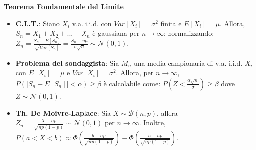 \documentclass[8pt]{extarticle}
\begin{document}
\begin{multicols*}{3}
    \textbf{\underline{Teorema Fondamentale del Limite}}
    \begin{itemize}
        \item \textbf{C.L.T.}: Siano $X_{i}$ v.a. i.i.d. con $Var[X_{i}]=\sigma^{2}$ finita e $E[X_{i}]=\mu$. Allora, $S_{n}=X_{1}+X_{2}+...+X_{n}$ è gaussiana per $n\rightarrow\infty$; normalizzando: $Z_{n}=\frac{S_{n}-E[S_{n}]}{\sqrt{Var[S_{n}]}}=\frac{S_{n}-n\mu}{\sigma\sqrt{n}}\sim\mathcal{N}(0,1)$.
        \item \textbf{Problema del sondaggista}: Sia $M_{n}$ una media campionaria di v.a. i.i.d. $X_{i}$ con $E[X_{i}]=\mu$ e $Var[X_{i}]=\sigma^{2}$. Allora, per $n\rightarrow\infty$, $P(|S_{n}-E[S_{n}]|<\alpha)\ge\beta$ è calcolabile come: $P\left(Z<\frac{\alpha\sqrt{n}}{\sigma}\right)\ge\beta$ dove $Z\sim\mathcal{N}(0,1)$.
        \item \textbf{Th. De Moivre-Laplace}: Sia $X\sim\mathcal{B}(n,p)$, allora $Z_{n}=\frac{X-np}{\sqrt{np(1-p)}}\sim\mathcal{N}(0,1)$ per $n\rightarrow\infty$. Inoltre, $P(a<X<b)\approx\Phi\left(\frac{b-np}{\sqrt{np(1-p)}}\right)-\Phi\left(\frac{a-np}{\sqrt{np(1-p)}}\right)$.
    \end{itemize}


\end{multicols*}
\end{document}
